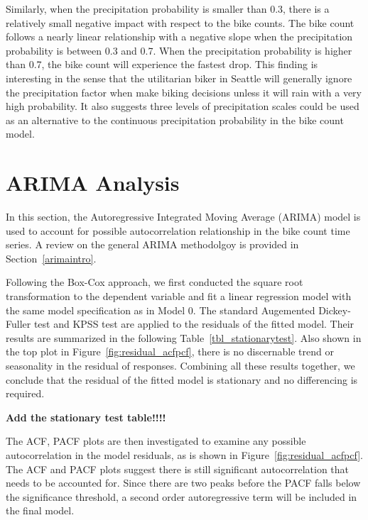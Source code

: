 \documentclass [11pt, proquest] {uwthesis}[2015/03/03]
\begin{document}
Similarly, when the precipitation probability is smaller than 0.3, there is a relatively small negative impact with respect to the bike counts. The bike count follows a nearly linear relationship with a negative slope when the precipitation probability is between 0.3 and 0.7. When the precipitation probability is higher than 0.7, the bike count will experience the fastest drop. This finding is interesting in the sense that the utilitarian biker in Seattle will generally ignore the precipitation factor when make biking decisions unless it will rain with a very high probability. It also suggests three levels of precipitation scales could be used as an alternative to the continuous precipitation probability in the bike count model.

\section{ARIMA Analysis}

In this section, the Autoregressive Integrated Moving Average (ARIMA) model is used to account for possible autocorrelation relationship in the bike count time series. A review on the general ARIMA methodolgoy is provided in Section~\ref{arimaintro}.

Following the Box-Cox approach, we first conducted the square root transformation to the dependent variable and fit a linear regression model with the same model specification as in Model 0. The standard Augemented Dickey-Fuller test and KPSS test are applied to the residuals of the fitted model. Their results are summarized in the following Table~\ref{tbl_stationarytest}. Also shown in the top plot in Figure~\ref{fig:residual_acfpcf}, there is no discernable trend or seasonality in the residual of responses. Combining all these results together, we conclude that the residual of the fitted model is stationary and no differencing is required. 

\textbf{Add the stationary test table!!!!}

The ACF, PACF plots are then investigated to examine any possible autocorrelation in the model residuals, as is shown in Figure~\ref{fig:residual_acfpcf}. The ACF and PACF plots suggest there is still significant autocorrelation that needs to be accounted for. Since there are two peaks before the PACF falls below the significance threshold, a second order autoregressive term will be included in the final model.
\end{document}
